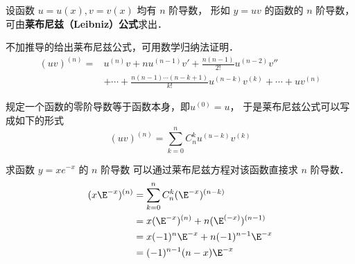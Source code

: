 

设函数 $u=u(x), v=v(x)$ 均有 $n$ 阶导数， 形如 $y=uv$ 的函数的 $n$ 阶导数， 可由\textbf{莱布尼兹（Leibniz）公式}求出．

不加推导的给出莱布尼兹公式，可用数学归纳法证明．
\begin{equation}
\begin{aligned}
(uv)^{(n)}=&u^{(n)}v+nu^{(n-1)}v'+\frac{n(n-1)}{2!}u^{(n-2)}v'' \\
&+ \cdots +\frac{n(n-1) \cdots (n-k+1)}{k!}u^{(n-k)}v^{(k)}+\cdots+uv^{(n)}
\end{aligned}
\end{equation}

规定一个函数的零阶导数等于函数本身，即$u^{(0)}=u$， 于是莱布尼兹公式可以写成如下的形式
\begin{equation}\label{LeiEqu_eq1}
(uv)^{(n)}=\sum_{k=0}^{n} C_{n}^{k}u^{(u-k)}v^{(k)}
\end{equation}

\begin{example}{求函数 $y=xe^{-x}$ 的 $n$ 阶导数}
可以通过莱布尼兹方程对该函数直接求 $n$ 阶导数．
\begin{equation}
\begin{aligned}
(x\E^{-x})^{(n)}&=\sum_{k=0}^{n} C_{n}^{k}(\E^{-x})^{(n-k)}\\
&=x(\E^{-x})^{(n)}+n(\E^{(-x)})^{(n-1)}\\
&=x(-1)^n\E^{-x}+n(-1)^{n-1}\E^{-x}\\
&=(-1)^{n-1}(n-x)\E^{-x}
\end{aligned}
\end{equation}
\end{example}
